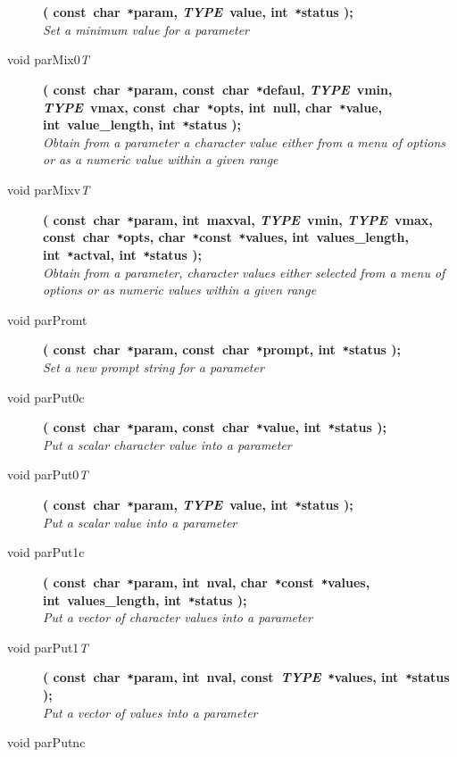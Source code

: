 \documentclass[twoside,11pt]{article}
\begin{document}
\begin{flushleft}
\begin{description}
\textbf{( const~char~\texttt{*}param, \textit{TYPE}~value,
          int~\texttt{*}status );}\\
\textit{Set a minimum value for a parameter}
\item[void parMix0\textit{T}]
\textbf{( const~char~\texttt{*}param, const~char~\texttt{*}defaul,
               \textit{TYPE}~vmin, \textit{TYPE}~vmax, 
               const~char~\texttt{*}opts, int~null, char~\texttt{*}value,
               int~value\_length, int~\texttt{*}status );} \\
\textit{Obtain from a parameter a character value either from a menu of
            options or as a numeric value within a given range}
\item[void parMixv\textit{T}]
\textbf{( const~char~\texttt{*}param, int~maxval, \textit{TYPE}~vmin, 
               \textit{TYPE}~vmax, const~char~\texttt{*}opts,
               char~\texttt{*}const~\texttt{*}values, int~values\_length,
               int~\texttt{*}actval, int~\texttt{*}status );} \\
\textit{Obtain from a parameter, character values either selected from a
            menu of options or as numeric values within a given range}
\item[void parPromt]
\textbf{( const~char~\texttt{*}param, const~char~\texttt{*}prompt,
          int~\texttt{*}status );}\\
\textit{Set a new prompt string for a parameter}
\item[void parPut0c]
\textbf{( const~char~\texttt{*}param, const~char~\texttt{*}value,
          int~\texttt{*}status );}\\
\textit{Put a scalar character value into a parameter}
\item[void parPut0\textit{T}]
\textbf{( const~char~\texttt{*}param, \textit{TYPE}~value,
          int~\texttt{*}status );}\\
\textit{Put a scalar value into a parameter}
\item[void parPut1c]
\textbf{( const~char~\texttt{*}param, int~nval, 
               char~\texttt{*}const~\texttt{*}values,  int~values\_length,
               int~\texttt{*}status );} \\
\textit{Put a vector of character values into a parameter}
\item[void parPut1\textit{T}]
\textbf{( const~char~\texttt{*}param, int~nval, 
          const~\textit{TYPE}~\texttt{*}values, int~\texttt{*}status );}\\
\textit{Put a vector of values into a parameter}
\item[void parPutnc]

\end{description}
\end{flushleft}
\end{document}
